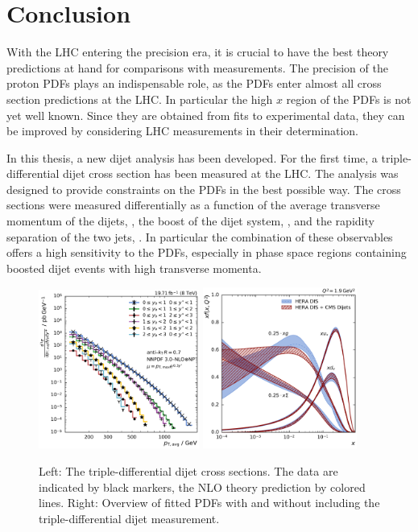 
\chapter{Conclusion}

With the LHC entering the precision era, it is crucial to have the best theory
predictions at hand for comparisons with measurements. The precision of the
proton PDFs plays an indispensable role, as the PDFs enter almost all cross
section predictions at the LHC. In particular the high $x$ region of the PDFs is
not yet well known. Since they are obtained from fits to experimental data, they
can be improved by considering LHC measurements in their determination.

In this thesis, a new dijet analysis has been developed. For the first time, a
triple-differential dijet cross section has been measured at the LHC. The
analysis was designed to provide constraints on the PDFs in the best possible
way. The cross sections were measured differentially as a function of the
average transverse momentum of the dijets, \ptavg, the boost of the dijet
system, \yboost, and the rapidity separation of the two jets, \ystar. In
particular the combination of these observables offers a high sensitivity to the
PDFs, especially in phase space regions containing boosted dijet events with
high transverse momenta.


\begin{figure}[h!tbp]
    \centering
    \includegraphics[width=0.47\textwidth]{figures/measurement/ptavg_spectrum.pdf}\hfill
    \includegraphics[width=0.45\textwidth]{figures/pdf_constraints/pdfcomp_direct_overview_1.9.pdf}
    \caption[Summary plot of results]{Left:
    The triple-differential dijet cross sections. The data are indicated by black
    markers, the NLO theory prediction by colored lines. Right: Overview of
    fitted PDFs with and without including the triple-differential dijet
    measurement.}
    \label{fig:conclusion}
\end{figure}

